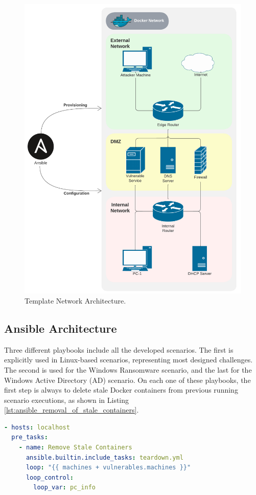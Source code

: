 \begin{figure}[H]
    \includegraphics[width=12cm]{figures/example.pdf}
    \caption{Template Network Architecture.}
    \label{fig:template_net}
\end{figure}

\subsection{Ansible Architecture} \label{sec:ansible_structure}

Three different playbooks include all the developed scenarios. The first is explicitly used in Linux-based scenarios, representing most designed challenges. The second is used for the Windows Ransomware scenario, and the last for the Windows Active Directory (AD) scenario. On each one of these playbooks, the first step is always to delete stale Docker containers from previous running scenario executions, as shown in Listing \ref{lst:ansible_removal_of_stale_containers}.

\begin{lstlisting}[language=yaml,caption=Removal of Stale Containers.,numbers=none,label={lst:ansible_removal_of_stale_containers}]
- hosts: localhost
  pre_tasks:
    - name: Remove Stale Containers
      ansible.builtin.include_tasks: teardown.yml
      loop: "{{ machines + vulnerables.machines }}"
      loop_control:
        loop_var: pc_info
\end{lstlisting}

